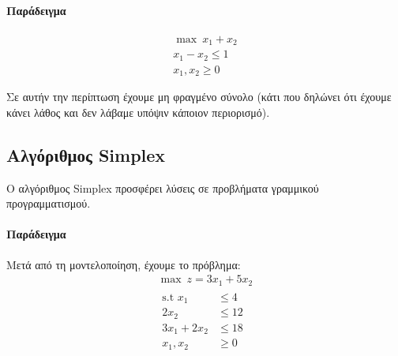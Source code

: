 \documentclass[11pt,a4paper,notitlepage,fleqn,final]{article}
\begin{document}
\paragraph{Παράδειγμα}
\begin{gather*}
	\max \ x_1+x_2 \\
	x_1-x_2 \leq 1 \\
	x_1,x_2 \geq 0
\end{gather*}


Σε αυτήν την περίπτωση έχουμε μη φραγμένο σύνολο (κάτι που δηλώνει ότι έχουμε κάνει λάθος και
δεν λάβαμε υπόψιν κάποιον περιορισμό).

\subsection{Αλγόριθμος Simplex}
Ο αλγόριθμος Simplex προσφέρει λύσεις σε προβλήματα γραμμικού προγραμματισμού.

\paragraph{Παράδειγμα}
Μετά από τη μοντελοποίηση, έχουμε το πρόβλημα:
\begin{gather*}
	\max \ z=3x_1+5x_2 \\
	\begin{array}{rl}
	\text{s.t } x_1 &\leq 4 \\
	2x_2 &\leq 12 \\
	3x_1+2x_2 &\leq 18 \\
	x_1,x_2 &\geq 0
	\end{array}
\end{gather*}
\end{document}
